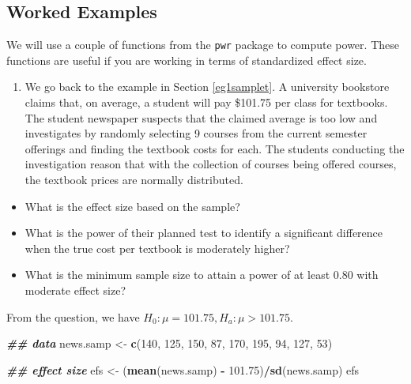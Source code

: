 \documentclass[
]{book}
\newenvironment{Shaded}{\begin{snugshade}}{\end{snugshade}}
\newcommand{\DecValTok}[1]{\textcolor[rgb]{0.00,0.00,0.81}{#1}}
\newcommand{\DocumentationTok}[1]{\textcolor[rgb]{0.56,0.35,0.01}{\textbf{\textit{#1}}}}
\newcommand{\FloatTok}[1]{\textcolor[rgb]{0.00,0.00,0.81}{#1}}
\newcommand{\FunctionTok}[1]{\textcolor[rgb]{0.13,0.29,0.53}{\textbf{#1}}}
\newcommand{\NormalTok}[1]{#1}
\newcommand{\OtherTok}[1]{\textcolor[rgb]{0.56,0.35,0.01}{#1}}
\newcommand{\SpecialCharTok}[1]{\textcolor[rgb]{0.81,0.36,0.00}{\textbf{#1}}}
\providecommand{\tightlist}{%
  \setlength{\itemsep}{0pt}\setlength{\parskip}{0pt}}
\theoremstyle{definition}
\theoremstyle{definition}
\theoremstyle{definition}
\theoremstyle{definition}
\theoremstyle{remark}
\begin{document}
\hypertarget{worked-examples}{%
\subsection{Worked Examples}\label{worked-examples}}

We will use a couple of functions from the \texttt{pwr} package to compute power. These functions are useful if you are working in terms of standardized effect size.

\begin{enumerate}
\def\labelenumi{\arabic{enumi}.}
\tightlist
\item
  We go back to the example in Section \ref{eg1samplet}. A university bookstore claims that, on average, a student will pay \$101.75 per class for textbooks. The student newspaper suspects that the claimed average is too low and investigates by randomly selecting 9 courses from the current semester offerings and finding the textbook costs for each. The students conducting the investigation reason that with the collection of courses being offered courses, the textbook prices are normally distributed.
\end{enumerate}

\begin{itemize}
\tightlist
\item
  What is the effect size based on the sample?
\item
  What is the power of their planned test to identify a significant difference when the true cost per textbook is moderately higher?
\item
  What is the minimum sample size to attain a power of at least 0.80 with moderate effect size?
\end{itemize}

From the question, we have \(H_0: \mu = 101.75, H_a: \mu > 101.75\).

\begin{Shaded}
\begin{Highlighting}[]
\DocumentationTok{\#\# data}
\NormalTok{news.samp }\OtherTok{\textless{}{-}} \FunctionTok{c}\NormalTok{(}\DecValTok{140}\NormalTok{, }\DecValTok{125}\NormalTok{, }\DecValTok{150}\NormalTok{, }\DecValTok{87}\NormalTok{, }\DecValTok{170}\NormalTok{, }\DecValTok{195}\NormalTok{, }\DecValTok{94}\NormalTok{, }\DecValTok{127}\NormalTok{, }\DecValTok{53}\NormalTok{)}

\DocumentationTok{\#\# effect size}
\NormalTok{efs }\OtherTok{\textless{}{-}}\NormalTok{ (}\FunctionTok{mean}\NormalTok{(news.samp) }\SpecialCharTok{{-}} \FloatTok{101.75}\NormalTok{)}\SpecialCharTok{/}\FunctionTok{sd}\NormalTok{(news.samp)}
\NormalTok{efs}
\end{Highlighting}
\end{Shaded}
\end{document}
